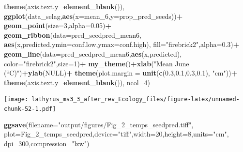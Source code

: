 \documentclass[
]{article}
\newenvironment{Shaded}{\begin{snugshade}}{\end{snugshade}}
\newcommand{\DataTypeTok}[1]{\textcolor[rgb]{0.13,0.29,0.53}{#1}}
\newcommand{\DecValTok}[1]{\textcolor[rgb]{0.00,0.00,0.81}{#1}}
\newcommand{\FloatTok}[1]{\textcolor[rgb]{0.00,0.00,0.81}{#1}}
\newcommand{\KeywordTok}[1]{\textcolor[rgb]{0.13,0.29,0.53}{\textbf{#1}}}
\newcommand{\NormalTok}[1]{#1}
\newcommand{\OperatorTok}[1]{\textcolor[rgb]{0.81,0.36,0.00}{\textbf{#1}}}
\newcommand{\OtherTok}[1]{\textcolor[rgb]{0.56,0.35,0.01}{#1}}
\newcommand{\StringTok}[1]{\textcolor[rgb]{0.31,0.60,0.02}{#1}}
\begin{document}
\begin{Shaded}
\begin{Highlighting}[]
\StringTok{    }\KeywordTok{theme}\NormalTok{(}\DataTypeTok{axis.text.y=}\KeywordTok{element\_blank}\NormalTok{()),}
  \KeywordTok{ggplot}\NormalTok{(data\_selag,}\KeywordTok{aes}\NormalTok{(}\DataTypeTok{x=}\NormalTok{mean\_}\DecValTok{6}\NormalTok{,}\DataTypeTok{y=}\NormalTok{prop\_pred\_seeds))}\OperatorTok{+}
\StringTok{    }\KeywordTok{geom\_point}\NormalTok{(}\DataTypeTok{size=}\DecValTok{3}\NormalTok{,}\DataTypeTok{alpha=}\FloatTok{0.05}\NormalTok{)}\OperatorTok{+}
\StringTok{    }\KeywordTok{geom\_ribbon}\NormalTok{(}\DataTypeTok{data=}\NormalTok{pred\_seedpred\_mean6,}
                \KeywordTok{aes}\NormalTok{(x,predicted,}\DataTypeTok{ymin=}\NormalTok{conf.low,}\DataTypeTok{ymax=}\NormalTok{conf.high),}
                \DataTypeTok{fill=}\StringTok{"firebrick2"}\NormalTok{,}\DataTypeTok{alpha=}\FloatTok{0.3}\NormalTok{)}\OperatorTok{+}
\StringTok{    }\KeywordTok{geom\_line}\NormalTok{(}\DataTypeTok{data=}\NormalTok{pred\_seedpred\_mean6,}\KeywordTok{aes}\NormalTok{(x,predicted),}
              \DataTypeTok{color=}\StringTok{"firebrick2"}\NormalTok{,}\DataTypeTok{size=}\DecValTok{1}\NormalTok{)}\OperatorTok{+}
\StringTok{    }\KeywordTok{my\_theme}\NormalTok{()}\OperatorTok{+}\KeywordTok{xlab}\NormalTok{(}\StringTok{"Mean June (ºC)"}\NormalTok{)}\OperatorTok{+}\KeywordTok{ylab}\NormalTok{(}\OtherTok{NULL}\NormalTok{)}\OperatorTok{+}
\StringTok{    }\KeywordTok{theme}\NormalTok{(}\DataTypeTok{plot.margin =} \KeywordTok{unit}\NormalTok{(}\KeywordTok{c}\NormalTok{(}\FloatTok{0.3}\NormalTok{,}\FloatTok{0.1}\NormalTok{,}\FloatTok{0.3}\NormalTok{,}\FloatTok{0.1}\NormalTok{), }\StringTok{"cm"}\NormalTok{))}\OperatorTok{+}
\StringTok{    }\KeywordTok{theme}\NormalTok{(}\DataTypeTok{axis.text.y=}\KeywordTok{element\_blank}\NormalTok{()),}
  \DataTypeTok{ncol=}\DecValTok{4}\NormalTok{)}
\end{Highlighting}
\end{Shaded}

\texttt{[image: lathyrus\_ms3\_3\_after\_rev\_Ecology\_files/figure-latex/unnamed-chunk-52-1.pdf]}

\begin{Shaded}
\begin{Highlighting}[]
\KeywordTok{ggsave}\NormalTok{(}\DataTypeTok{filename=}\StringTok{"output/figures/Fig\_2\_temps\_seedpred.tiff"}\NormalTok{,}
       \DataTypeTok{plot=}\NormalTok{Fig\_}\DecValTok{2}\NormalTok{\_temps\_seedpred,}\DataTypeTok{device=}\StringTok{"tiff"}\NormalTok{,}\DataTypeTok{width=}\DecValTok{20}\NormalTok{,}\DataTypeTok{height=}\DecValTok{8}\NormalTok{,}\DataTypeTok{units=}\StringTok{"cm"}\NormalTok{,}
       \DataTypeTok{dpi=}\DecValTok{300}\NormalTok{,}\DataTypeTok{compression=}\StringTok{"lzw"}\NormalTok{)}
\end{Highlighting}
\end{Shaded}
\end{document}

